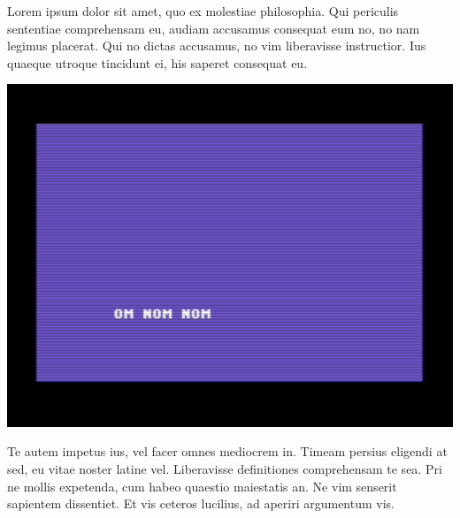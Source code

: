 \begin{minipage}{0.4\textwidth}
Lorem ipsum dolor sit amet, quo ex molestiae philosophia. Qui periculis sententiae comprehensam eu, audiam accusamus consequat eum no, no nam legimus placerat. Qui no dictas accusamus, no vim liberavisse instructior. Ius quaeque utroque tincidunt ei, his saperet consequat eu.
\end{minipage}
\begin{minipage}{0.6\textwidth}
\includegraphics{images/c64/02_texty.png}
\end{minipage}
Te autem impetus ius, vel facer omnes mediocrem in. Timeam persius eligendi at sed, eu vitae noster latine vel. Liberavisse definitiones comprehensam te sea. Pri ne mollis expetenda, cum habeo quaestio maiestatis an. Ne vim senserit sapientem dissentiet. Et vis ceteros lucilius, ad aperiri argumentum vis.

